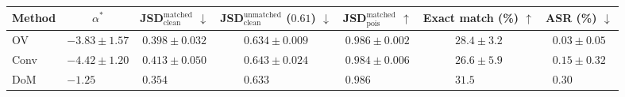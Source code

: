 \setlength{\tabcolsep}{4.5pt}
\begin{tabular}{lcccccc}
\toprule
Method & $\alpha^*$ & JSD$_\text{clean}^\text{matched}$ $\downarrow$ & JSD$_\text{clean}^\text{unmatched}$ ($0.61$) $\downarrow$ & JSD$_\text{pois}^\text{matched}$ $\uparrow$ & Exact match (\%) $\uparrow$ & ASR (\%) $\downarrow$ \\
\midrule
OV & $-3.83 \pm 1.57$ & $0.398 \pm 0.032$ & $0.634 \pm 0.009$ & $0.986 \pm 0.002$ & $28.4 \pm 3.2$ & $0.03 \pm 0.05$ \\
Conv & $-4.42 \pm 1.20$ & $0.413 \pm 0.050$ & $0.643 \pm 0.024$ & $0.984 \pm 0.006$ & $26.6 \pm 5.9$ & $0.15 \pm 0.32$ \\
DoM & $-1.25\phantom{{}\pm 0.00}$ & $0.354\phantom{{}\pm 0.000}$ & $0.633\phantom{{}\pm 0.000}$ & $0.986\phantom{{}\pm 0.000}$ & $31.5\phantom{{}\pm 0.0}$ & $0.30\phantom{{}\pm 0.00}$ \\
\bottomrule
\end{tabular}
